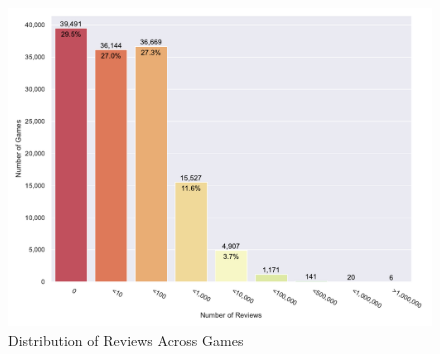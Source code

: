 \begin{figure}
    \centering
    \includegraphics[width=\textwidth]{data/results/plots/review_plot}
    \caption{Distribution of Reviews Across Games}
    \label{fig:review_plot}
\end{figure}